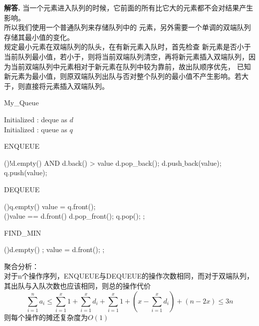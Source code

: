 \documentclass[12pt, a4paper, oneside]{ctexart}
\newenvironment{solution}{\par\noindent\textbf{解答. }}{\par}
\begin{document}
\begin{solution}
    当一个元素进入队列的时候，它前面的所有比它大的元素都不会对结果产生影响。\\所以我们使用一个普通队列来存储队列中的
    元素，另外需要一个单调的双端队列存储其最小值的变化。\\规定最小元素在双端队列的队头，在有新元素入队时，首先检查
    新元素是否小于当前队列最小值，若小于，则将当前双端队列清空，再将新元素插入双端队列，因为当前双端队列中元素相对于新元素在队列中较为靠前，故出队顺序优先，
    已知新元素为最小值，则原双端队列出队与否对整个队列的最小值不产生影响。若大于，则直接将元素插入双端队列。\\
    \begin{algorithm*}
        \caption{My\_Queue}
        \label{alg:algorithm}
        Initialized : deque as $d$\\
        Initialized : queue as $q$
    \end{algorithm*}
    \begin{algorithm*}
        \caption{ENQUEUE}
        \label{alg:algorithm}
        \While(){!d.empty() AND d.back() > value}{
            d.pop\_back();
        }
        d.push$\_$back(value);\\
        q.push(value);
    \end{algorithm*}
    \pagebreak
    \begin{algorithm*}
        \caption{DEQUEUE}
        \label{alg:algorithm}
        \If(){q.empty()}{
        }
        value = q.front();\\
        \If(){value == d.front()}{
            d.pop\_front();
        }
        q.pop();
        \BlankLine
        ;
    \end{algorithm*}
    \begin{algorithm*}
        \caption{FIND\_MIN}
        \label{alg:algorithm}
        \If(){d.empty()}{
            ;
        }
        value = d.front();
        \BlankLine
        ;
    \end{algorithm*}
    \newpage
聚合分析：\\
对于n个操作序列，ENQUEUE与DEQUEUE的操作次数相同，而对于双端队列，其出队与入队次数也应该相同，则总的操作代价
$$\sum_{i=1}^{n}a_{i}\leq \sum_{i=1}^{x}1+\sum_{i=1}^{x}d_{i}+\sum_{i=1}^{x}1+(x-\sum_{i=1}^{x}d_{i})+(n-2x)
\leq 3n$$
则每个操作的摊还复杂度为$O(1)$
\end{solution}
\end{document}
